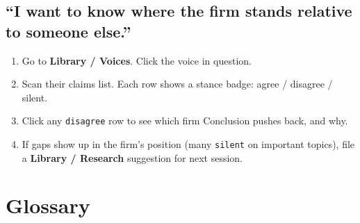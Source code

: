 \documentclass[11pt,letterpaper]{article}
\newcommand{\page}[1]{\textbf{#1}}
\begin{document}
\subsection{``I want to know where the firm stands relative to someone else.''}
\begin{enumerate}[leftmargin=*,itemsep=0.2em]
  \item Go to \page{Library / Voices}. Click the voice in question.
  \item Scan their claims list. Each row shows a stance badge: agree / disagree / silent.
  \item Click any \texttt{disagree} row to see which firm Conclusion pushes back, and why.
  \item If gaps show up in the firm's position (many \texttt{silent} on important topics), file a \page{Library / Research} suggestion for next session.
\end{enumerate}

\section{Glossary}
\end{document}
